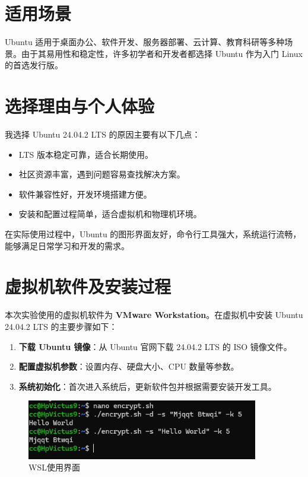 \documentclass[12pt,hyperref,a4paper,UTF8]{ctexart}
\begin{document}
\section{适用场景}
Ubuntu 适用于桌面办公、软件开发、服务器部署、云计算、教育科研等多种场景。由于其易用性和稳定性，许多初学者和开发者都选择 Ubuntu 作为入门 Linux 的首选发行版。

\section{选择理由与个人体验}
我选择 Ubuntu 24.04.2 LTS 的原因主要有以下几点：
\begin{itemize}
    \item LTS 版本稳定可靠，适合长期使用。
    \item 社区资源丰富，遇到问题容易查找解决方案。
    \item 软件兼容性好，开发环境搭建方便。
    \item 安装和配置过程简单，适合虚拟机和物理机环境。
\end{itemize}
在实际使用过程中，Ubuntu 的图形界面友好，命令行工具强大，系统运行流畅，能够满足日常学习和开发的需求。

\section{虚拟机软件及安装过程}
本次实验使用的虚拟机软件为 \textbf{VMware Workstation}。在虚拟机中安装 Ubuntu 24.04.2 LTS 的主要步骤如下：

\begin{enumerate}
    \item \textbf{下载 Ubuntu 镜像}：从 Ubuntu 官网下载 24.04.2 LTS 的 ISO 镜像文件。
    \item \textbf{配置虚拟机参数}：设置内存、硬盘大小、CPU 数量等参数。
    \item \textbf{系统初始化}：首次进入系统后，更新软件包并根据需要安装开发工具。
\end{enumerate}

\begin{figure}[h]
    \centering
    \includegraphics[width=0.9\textwidth]{figures/201.png}
    \caption{WSL使用界面}
\end{figure}
\end{document}
